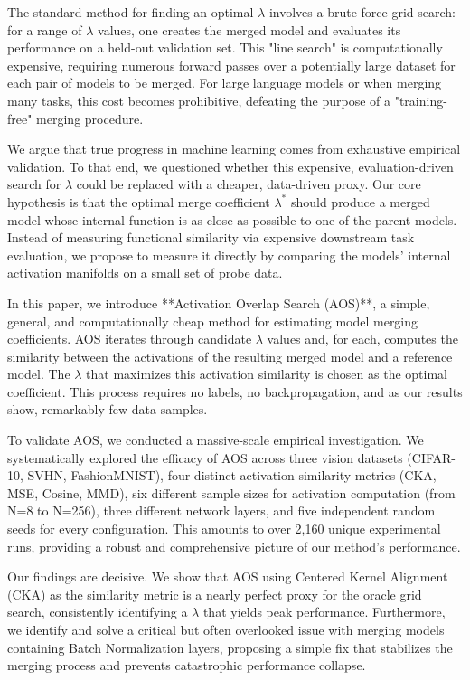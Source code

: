 \documentclass{article}
\theoremstyle{plain}
\theoremstyle{definition}
\theoremstyle{remark}
\begin{document}
The standard method for finding an optimal $\lambda$ involves a brute-force grid search: for a range of $\lambda$ values, one creates the merged model and evaluates its performance on a held-out validation set. This "line search" is computationally expensive, requiring numerous forward passes over a potentially large dataset for each pair of models to be merged. For large language models or when merging many tasks, this cost becomes prohibitive, defeating the purpose of a "training-free" merging procedure.

We argue that true progress in machine learning comes from exhaustive empirical validation. To that end, we questioned whether this expensive, evaluation-driven search for $\lambda$ could be replaced with a cheaper, data-driven proxy. Our core hypothesis is that the optimal merge coefficient $\lambda^*$ should produce a merged model whose internal function is as close as possible to one of the parent models. Instead of measuring functional similarity via expensive downstream task evaluation, we propose to measure it directly by comparing the models' internal activation manifolds on a small set of probe data.

In this paper, we introduce **Activation Overlap Search (AOS)**, a simple, general, and computationally cheap method for estimating model merging coefficients. AOS iterates through candidate $\lambda$ values and, for each, computes the similarity between the activations of the resulting merged model and a reference model. The $\lambda$ that maximizes this activation similarity is chosen as the optimal coefficient. This process requires no labels, no backpropagation, and as our results show, remarkably few data samples.

To validate AOS, we conducted a massive-scale empirical investigation. We systematically explored the efficacy of AOS across three vision datasets (CIFAR-10, SVHN, FashionMNIST), four distinct activation similarity metrics (CKA, MSE, Cosine, MMD), six different sample sizes for activation computation (from N=8 to N=256), three different network layers, and five independent random seeds for every configuration. This amounts to over 2,160 unique experimental runs, providing a robust and comprehensive picture of our method's performance.

Our findings are decisive. We show that AOS using Centered Kernel Alignment (CKA) as the similarity metric is a nearly perfect proxy for the oracle grid search, consistently identifying a $\lambda$ that yields peak performance. Furthermore, we identify and solve a critical but often overlooked issue with merging models containing Batch Normalization layers, proposing a simple fix that stabilizes the merging process and prevents catastrophic performance collapse.
\end{document}
